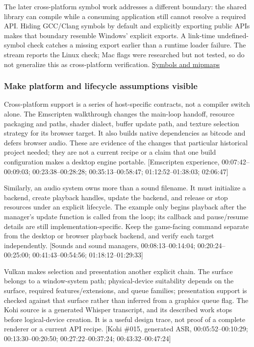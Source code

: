 The later cross-platform symbol work addresses a different boundary: the shared library can compile while a consuming application still cannot resolve a required API. Hiding GCC/Clang symbols by default and explicitly exporting public APIs makes that boundary resemble Windows' explicit exports. A link-time undefined-symbol check catches a missing export earlier than a runtime loader failure. The stream reports the Linux check; Mac flags were researched but not tested, so do not generalize this as cross-platform verification. \href{https://www.youtube.com/watch?v=xb23Y9o7tP4}{Symbols and mipmaps}

\subsubsection{Make platform and lifecycle assumptions visible}\label{05-engine-i-ch013-make-platform-and-lifecycle-assumptions-visible}

Cross-platform support is a series of host-specific contracts, not a compiler switch alone. The Emscripten walkthrough changes the main-loop handoff, resource packaging and paths, shader dialect, buffer update path, and texture selection strategy for its browser target. It also builds native dependencies as bitcode and defers browser audio. These are evidence of the changes that particular historical project needed; they are not a current recipe or a claim that one build configuration makes a desktop engine portable. {[}Emscripten experience, 00:07:42--00:09:03; 00:23:38--00:28:28; 00:35:13--00:58:47; 01:12:52--01:38:03; 02:06:47{]}

Similarly, an audio system owns more than a sound filename. It must initialize a backend, create playback handles, update the backend, and release or stop resources under an explicit lifecycle. The example only begins playback after the manager's update function is called from the loop; its callback and pause/resume details are still implementation-specific. Keep the game-facing command separate from the desktop or browser playback backend, and verify each target independently. {[}Sounds and sound managers, 00:08:13--00:14:04; 00:20:24--00:25:00; 00:41:43--00:54:56; 01:18:12--01:29:33{]}

Vulkan makes selection and presentation another explicit chain. The surface belongs to a window-system path; physical-device suitability depends on the surface, required features/extensions, and queue families; presentation support is checked against that surface rather than inferred from a graphics queue flag. The Kohi source is a generated Whisper transcript, and its described work stops before logical-device creation. It is a useful design trace, not proof of a complete renderer or a current API recipe. {[}Kohi \#015, generated ASR, 00:05:52--00:10:29; 00:13:30--00:20:50; 00:27:22--00:37:24; 00:43:32--00:47:24{]}

